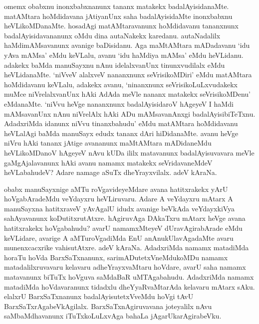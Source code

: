 omemx obabxnu inonxbabxnanunx tananx matakekx badalAyisidanaMte. matAMtara hoMdidavana jAtiyanUnx saha badalAyisidaMte inonxbabxnu heVLikoMDanaMte. hosadAgi matAMtaravanunx hoMdidavanu tananxnunx badalAyisidavananunx oMdu dina autaNakekx karedanu. autaNadalilx haMdimAMsavanunx avanige baDisidanu. Aga maMtAMtara mADadavanu `idu yAva mAMsa' eMdu keVLalu, avanu `idu haMdiya mAMsa' eMdu heVLidanu. adakekx baMda manuSayxnu nAnu idelalxvanUnx tinunxvudilalx eMdu heVLidanaMte. `niVveV alalxveV nananxnunx seVrisikoMDiri' eMdu 
matAMtara hoMdidavanu keVLalu, adakekx avanu, `ninanxnunx seVrisikoLuLxvudakekx muMce niVrelalxvanUnx hAki AdAda meVle nananx matakekx seVrisikoMDenu' eMdanaMte. `niVvu heVge nananxnunx badalAyisidaroV hAgeyeV I haMdi mAMsavanUnx nAnu niVrelAlx hAki ADu mAMsavanAnxgi badalAyisibiTeTxnu. AdadxriMda idanunx niVvu tinanxbahudu' eMdu matAMtara hoMdidavanu heVLalAgi baMda manuSayx edudx tananx dAri hiDidanaMte. avanu heVge niVru hAki tananx jAtige avananunx maMtAMtara mADidaneMdu heVLikoMDanoV hAgeyeV nAvu kUDa ililx matavanunx badalAyisuvavara meVle gaMgAjalavanunx hAki avanu namamx matakekx seVridavaneMdeV heVLabahudeV? Adare namage aSuTx dheYrayxvilalx. adeV kAraNa.

obabx manuSayxnige aMTu roVgavideyeMdare avana hatitxrakekx yArU hoVgabAradeMdu veYdayxru heVLiruvaru. Adare A veYdayxru mAtarx A manuSayxna hatitxraveV yAvAgalU idudx avanige beVkAda veYdayxkiVya sahAyavanunx koDutitxrutAtxre. hAgiruvAga DAkaTxru mAtarx heVge avana hatitxrakekx hoVgabahudu? avarU namamxMteyeV dUravAgirabArade eMdu keVLidare, avarige A aMTuroVgadiMda EnU anAnukUlavAgadaMte avaru munenxcacxrike vahisutAtxre. adeV kAraNa. AdadxriMda namamx matadiMda horaTu hoVda BarxSaTxnanunx, sarimADutetxVneMdukoMDu 
namamx matadalilxruvavaru kelavaru adheYrayxvaMtaru hoVdare, avarU saha namamx matavanunx biTuTx hoVguva saMdaBaR uMTAgabahudu. AdadxriMda namamx matadiMda hoVdavaranunx tidadxlu dheYyaRvaMtarAda kelavaru mAtarx sAku. elalxrU BarxSaTxnanunx badalAyisutetxVveMdu hoVgi tAvU BarxSaTxrAgabeVkAgilalx. BarxSaTxnAgiruvavana joteyalilx nAvu saMbaMdhavanunx iTuTxkoLuLxvAga bahaLa jAgarUkarAgirabeVku.

